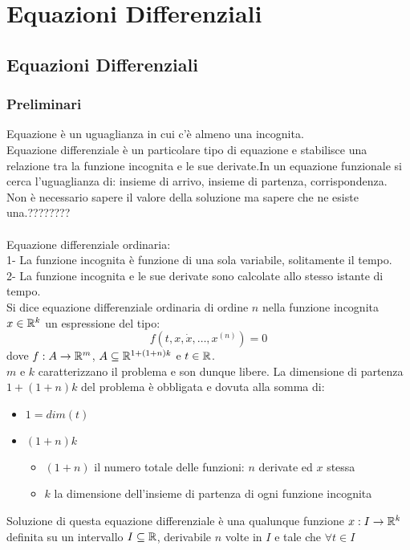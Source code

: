 \part{Equazioni Differenziali}
\chapter{Equazioni Differenziali}
\section{Preliminari}
Equazione è un uguaglianza in cui c'è almeno una incognita.\\
Equazione differenziale è un particolare tipo di equazione e stabilisce una relazione tra la funzione incognita e le sue derivate.In un equazione funzionale si cerca l'uguaglianza di: insieme di arrivo, insieme di partenza, corrispondenza.\\
Non è necessario sapere il valore della soluzione ma sapere che ne esiste una.????????\\\\
Equazione differenziale ordinaria:\\
1- La funzione incognita è funzione di una sola variabile, solitamente il tempo.\\
2- La funzione incognita e le sue derivate sono calcolate allo stesso istante di tempo.\\
\label{def:equaz_diff}
Si dice equazione differenziale ordinaria di ordine $n$ nella funzione incognita $x\in \mathbb{R}^k$ un espressione del tipo:
$$f(t,x,\dot{x},\ldots,x^{(n)})=0$$
dove $f:A\to \mathbb{R}^m$, $A\subseteq \mathbb{R}^{1+(1+n)k}$ e $t\in \mathbb{R}$.\\
$m$ e $k$ caratterizzano il problema e son dunque libere. La dimensione di partenza $1+(1+n)k$ del problema è obbligata e dovuta alla somma di:
\begin{itemize}
	\item $1 = dim(t)$
	\item $(1+n)k$
	\begin{itemize}
		\item $(1+n)$ il numero totale delle funzioni: $n$ derivate ed $x$ stessa
		\item $k$ la dimensione dell'insieme di partenza di ogni funzione incognita
	\end{itemize}
\end{itemize}
Soluzione di questa equazione differenziale è una qualunque funzione $x:I\to \mathbb{R}^k$ definita su un intervallo $I\subseteq \mathbb{R}$, derivabile $n$ volte in $I$ e tale che $\forall t\in I$\\
